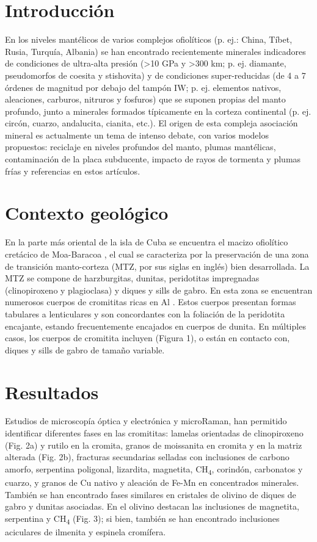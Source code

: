 \documentclass[a4paper,11pt]{article}
\begin{document}
	\begin{multicols}{2}
		\section{Introducción}
		En los niveles mantélicos de varios complejos ofiolíticos (p. ej.: China, Tíbet, Rusia, Turquía, Albania) se han encontrado recientemente minerales indicadores de condiciones de ultra-alta presión (\textgreater10 GPa y \textgreater300 km; p. ej. diamante, pseudomorfos de coesita y stishovita) y de condiciones super-reducidas (de 4 a 7 órdenes de magnitud por debajo del tampón IW; p. ej. elementos nativos, aleaciones, carburos, nitruros y fosfuros) que se suponen propias del manto profundo, junto a minerales formados típicamente en la corteza continental (p. ej. circón, cuarzo, andalucita, cianita, etc.). El origen de esta compleja asociación mineral es actualmente un tema de intenso debate, con varios modelos propuestos: reciclaje en niveles profundos del manto, plumas mantélicas, contaminación de la placa subducente, impacto de rayos de tormenta y plumas frías \cite{Pujol-Sola2018,Xiong} y referencias en estos artículos. 
		\section{Contexto geológico}
		En la parte más oriental de la isla de Cuba se encuentra el macizo ofiolítico cretácico de Moa-Baracoa \cite{Iturralde}, el cual se caracteriza por la preservación de una zona de transición manto-corteza (MTZ, por sus siglas en inglés) bien desarrollada. La MTZ se compone de harzburgitas, dunitas, peridotitas impregnadas (clinopiroxeno y plagioclasa) y diques y sills de gabro. En esta zona se encuentran numerosos cuerpos de cromititas ricas en Al \cite{Proenza1999}. Estos cuerpos presentan formas tabulares a lenticulares y son concordantes con la foliación de la peridotita encajante, estando frecuentemente encajados en cuerpos de dunita. En múltiples casos, los cuerpos de cromitita incluyen (Figura 1), o están en contacto con, diques y sills de gabro de tamaño variable.
	
		\section{Resultados}
		Estudios de microscopía óptica y electrónica y microRaman, han permitido identificar diferentes fases en las cromititas: lamelas orientadas de clinopiroxeno (Fig. 2a) y rutilo en la cromita, granos de moissanita en cromita y en la matriz alterada (Fig. 2b), fracturas secundarias selladas con inclusiones de carbono amorfo, serpentina poligonal, lizardita, magnetita, CH\textsubscript{4}, corindón, carbonatos y cuarzo, y granos de Cu nativo y aleación de Fe-Mn en concentrados minerales. 
		También se han encontrado fases similares en cristales de olivino de diques de gabro y dunitas asociadas. En el olivino destacan las inclusiones de magnetita, serpentina y CH\textsubscript{4} (Fig. 3); si bien, también se han encontrado inclusiones aciculares de ilmenita y espinela cromífera.
		

\end{multicols}
\end{document}
